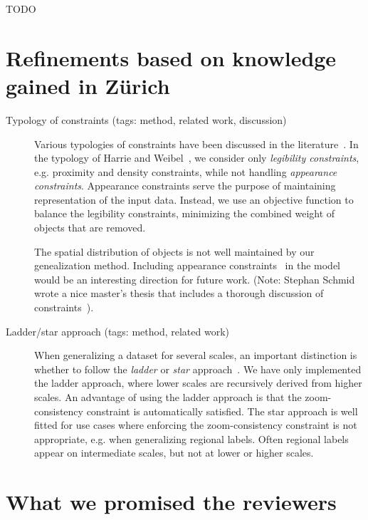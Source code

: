 \documentclass[11pt, oneside]{article}   	%
\begin{document}
TODO

\section{Refinements based on knowledge gained in Z\"{u}rich}

\begin{description}
\item[Typology of constraints (tags: method, related work, discussion)] Various typologies of constraints have been discussed in the literature~\cite{beard1991constraints,harrie2007modelling}. In the typology of Harrie and Weibel~\cite{harrie2007modelling}, we consider only \emph{legibility constraints},  e.g. proximity and density constraints, while not handling \emph{appearance constraints}. Appearance constraints serve the purpose of maintaining representation of the input data. Instead, we use an objective function to balance the legibility constraints, minimizing the combined weight of objects that are removed. 

The spatial distribution of objects is not well maintained by our genealization method. Including appearance constraints~\cite{harrie2007modelling} in the model would be an interesting direction for future work. (Note: Stephan Schmid wrote a nice master's thesis that includes a thorough discussion of constraints~\cite{schmid2008automated}).
\item[Ladder/star approach (tags: method, related work)] When generalizing a dataset for several scales, an important distinction is whether to follow the \emph{ladder} or \emph{star} approach~\cite{foerster2010challenges}. We have only implemented the ladder approach, where lower scales are recursively derived from higher scales. An advantage of using the ladder approach is that the zoom-consistency constraint is automatically satisfied. The star approach is well fitted for use cases where enforcing the zoom-consistency constraint is not appropriate, e.g. when generalizing regional labels. Often regional labels appear on intermediate scales, but not at lower or higher scales.
\end{description}

\section{What we promised the reviewers}
\end{document}
